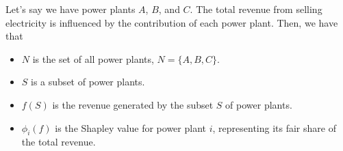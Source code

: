 \documentclass[letterpaper,10pt,english]{jupyterBook}
\begin{document}
\sphinxAtStartPar
Let’s say we have power plants \(A\), \(B\), and \(C\). The total revenue from selling electricity is influenced by the contribution of each power plant. Then, we have that
\begin{itemize}
\item {} 
\sphinxAtStartPar
\(N\) is the set of all power plants, \(N = \{A, B, C\}\).

\item {} 
\sphinxAtStartPar
\(S\) is a subset of power plants.

\item {} 
\sphinxAtStartPar
\(f(S)\) is the revenue generated by the subset \(S\) of power plants.

\item {} 
\sphinxAtStartPar
\(\phi_i(f)\) is the Shapley value for power plant \(i\), representing its fair share of the total revenue.

\end{itemize}
\end{document}
